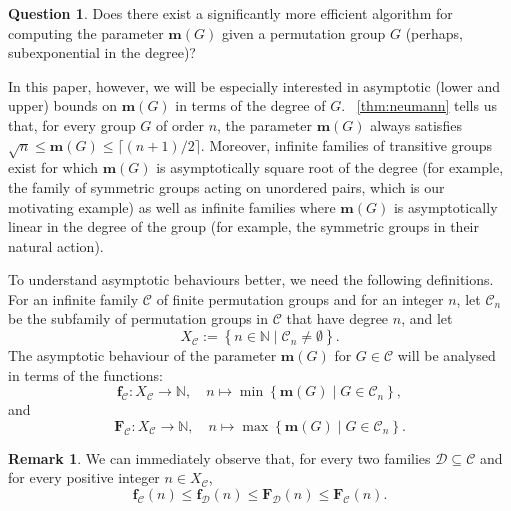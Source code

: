\documentclass[a4paper]{amsart}
\newcommand{\primozcomment}[1]{\textcolor{magenta}{{\textbf{Primoz:} #1}}}
\newcommand{\kalacomment}[1]{\textcolor{blue}{{\textbf{Kala:} #1}}}
\newcommand{\f}{\mathbf{f}}
\newcommand{\F}{\mathbf{F}}
\newcommand{\m}{\mathbf{m}}
\newcommand{\C}{\mathcal{C}}
\newcommand{\D}{\mathcal{D}}
\theoremstyle{definition}
\newtheorem{remark}[theorem]{Remark}
\newtheorem{vprasanje}[theorem]{Question}
\begin{document}
\begin{vprasanje}
    Does there exist a significantly more efficient algorithm for computing the parameter $\m(G)$ given a permutation group $G$ (perhaps, subexponential in the degree)?
\end{vprasanje}
In this paper, however, we will be especially interested in asymptotic (lower and upper) bounds on $\m(G)$ in terms of the degree of $G$. ~\cref{thm:neumann} tells us that, for every group $G$ of order $n$, the parameter $\m(G)$ always satisfies $\sqrt{n} \le \m(G) \le \lceil (n+1)/2 \rceil$.
Moreover, infinite families of transitive groups exist for which $\m(G)$ is asymptotically square root of the degree (for example,
the family of symmetric groups acting on unordered pairs, which is our motivating example) as well as infinite families where $\m(G)$ is asymptotically linear in the degree of the group (for example, the symmetric groups in their natural action). 


To understand asymptotic behaviours better, we need the following definitions. For an infinite family $\C$ of finite permutation groups and for an integer $n$, let $\C_n$ be the subfamily of permutation groups in $\C$ that have degree $n$, and let
\[ X _ {\C}:= \left\{ n\in \mathbb{N} \mid \C_n \ne \emptyset \right\} .\]
The asymptotic behaviour of the parameter $\m(G)$ for $G \in \C$ will be analysed in terms of the functions:
\[ \f_\C: X _ {\C} \to \mathbb{N}, \quad n \mapsto 
\min \left\{\m (G) \mid G \in \C_n \right\} ,\]
and
\[ \F_\C: X _ {\C} \to \mathbb{N}, \quad n \mapsto 
\max \left\{\m (G) \mid G \in \C_n \right\} .\]

\begin{remark}
\label{rem:sub}
We can immediately observe that, for every two families $\D\subseteq \C$ and for every positive integer $n\in X_\C$,
\[\f_\C(n) \le \f_\D(n) \le \F_\D(n) \le \F_\C(n) .\]
\end{remark}
\end{document}
